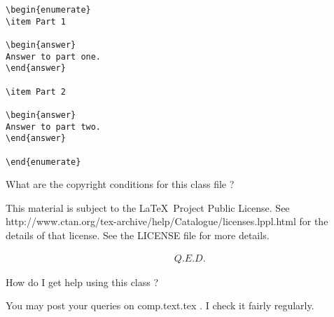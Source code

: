 \documentclass{assignment}
\begin{document}
\begin{problemlist}
\begin{problem}
\begin{enumerate}
\end{enumerate}

\begin{verbatim}
\begin{enumerate}
\item Part 1

\begin{answer}
Answer to part one.
\end{answer}

\item Part 2

\begin{answer}
Answer to part two.
\end{answer}

\end{enumerate}

\end{verbatim}

\end{problem}


\pbitem What are the copyright conditions for this class file ?

\begin{problem}

This material is subject to the \LaTeX\ Project Public License. See http://www.ctan.org/tex-archive/help/Catalogue/licenses.lppl.html for the details of that license. See the LICENSE file for more details.


\begin{answer}
\begin{eqnarray}
&& Q. E. D. \nonumber
\end{eqnarray}
\end{answer}

\end{problem}


\pbitem How do I get help using this class ?
\begin{problem}


You may post your queries on comp.text.tex . I check it fairly regularly.
\end{problem}

\end{problemlist}
\end{document}
